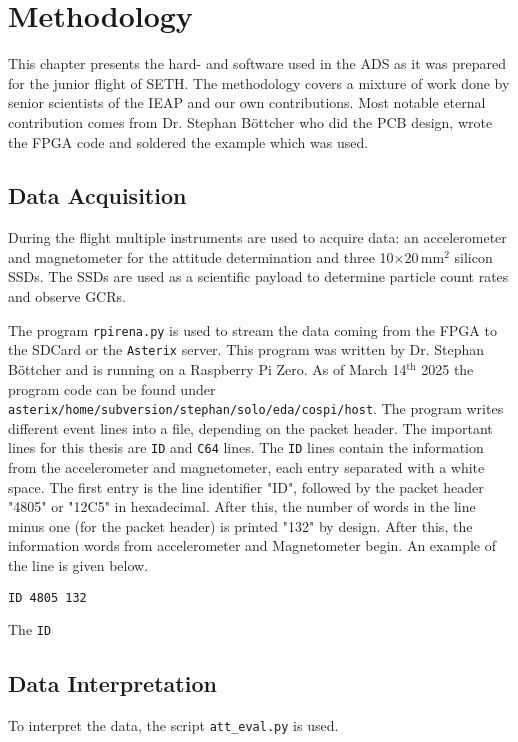\chapter{Methodology \label{ch:methodology}}
This chapter presents the hard- and software used in the \ac{ADS} as it was prepared for the junior flight of \ac{SETH}. The methodology covers a mixture of work done by senior scientists of the \ac{IEAP} and our own contributions. Most notable eternal contribution comes from Dr. Stephan Böttcher who did the \ac{PCB} design, wrote the \ac{FPGA} code and soldered the example which was used. 

\section{Data Acquisition \label{sec:meth:data_acquisition}}
During the flight multiple instruments are used to acquire data: an accelerometer and magnetometer for the attitude determination and three 10$\times$20\,mm$^2$ silicon \acfp{SSD}. The \acp{SSD} are used as a scientific payload to determine particle count rates and observe \acp{GCR}.

The program \verb|rpirena.py| is used to stream the data coming from the \ac{FPGA} to the SD\:Card or the \verb|Asterix| server. This program was written by Dr. Stephan Böttcher and is running on a Raspberry Pi Zero. As of March 14$^\mathrm{th}$ 2025 the program code can be found under \verb|asterix/home/subversion/stephan/solo/eda/cospi/host|. The program writes different event lines into a file, depending on the packet header. The important lines for this thesis are \verb|ID| and \verb|C64| lines. The \verb|ID| lines contain the information from the accelerometer and magnetometer, each entry separated with a white space. The first entry is the line identifier "ID", followed by the packet header "4805" or "12C5" in hexadecimal. After this, the number of words in the line minus one (for the packet header) is printed "132" by design. After this, the information words from accelerometer and Magnetometer begin. An example of the line is given below.
\begin{lstlisting}
ID 4805 132 
\end{lstlisting}

The \verb|ID| 

\section{Data Interpretation \label{sec:meth:data_interpretation}}
To interpret the data, the script \verb|att_eval.py| is used.

